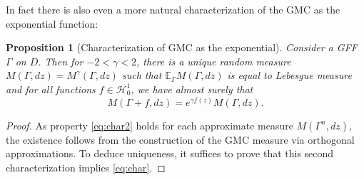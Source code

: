 \documentclass[11pt]{amsart}
\newtheorem{prop}[thm]{Proposition}
\newcommand{\E}{\mathbb E}
\renewcommand{\1}{\mathbf 1}
\begin{document}
In fact there is also even a more natural characterization of the GMC as the exponential function:

\begin{prop}[Characterization of GMC as the exponential]\label{prop:chr2}
Consider a GFF $\Gamma$ on $D$. Then for $-2 < \gamma < 2$, there is a unique random measure $M(\Gamma,dz)=M^\gamma(\Gamma,dz)$ such that $\E_\Gamma M(\Gamma,dz )$ is equal to Lebesgue measure and for all functions $f \in \mathcal{H}^1_0$, we have almost surely that 
\begin{equation}\label{eq:char2}
M(\Gamma + f, dz) = e^{\gamma f(z)}M(\Gamma,dz).
\end{equation}
\end{prop}

\begin{proof}
As property \eqref{eq:char2} holds for each approximate measure $M(\Gamma^n,dz)$, the existence follows from the construction of the GMC measure via orthogonal approximations. To deduce uniqueness, it suffices to prove that this second characterization implies \eqref{eq:char}. 


\end{proof}
\end{document}
